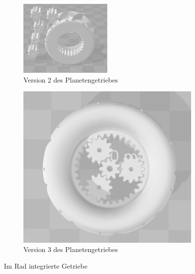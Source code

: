 \begin{figure}[!ht]
	\centering
	\begin{subfigure}[b]{0.4\textwidth}
		\includegraphics[width=0.5\textwidth]{bilder/GetriebeVersion3-1.png}
		\caption{Version 2 des Planetengetriebes}
		\label{bild:gearversion3-1}
	\end{subfigure}
	\begin{subfigure}[b]{0.4\textwidth}
		\includegraphics[width=\textwidth]{bilder/GetriebeVersion3-2.png}
		\caption{Version 3 des Planetengetriebes}
		\label{bild:gearversion3-2}
	\end{subfigure}
	\caption{Im Rad integrierte Getriebe}
\end{figure}

